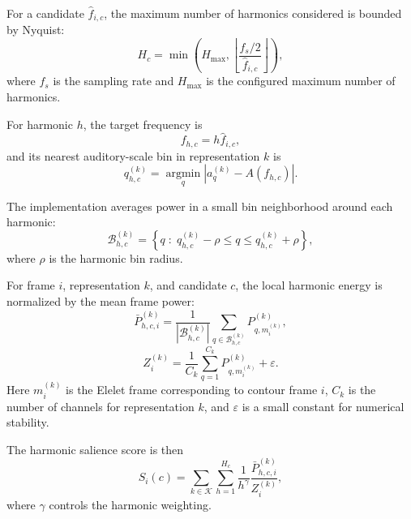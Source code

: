 For a candidate \(\hat{f}_{i,c}\), the maximum number of harmonics considered is
bounded by Nyquist:
\begin{equation}
    H_c =
    \min\left(
        H_{\max},
        \left\lfloor
            \frac{f_s/2}{\hat{f}_{i,c}}
        \right\rfloor
    \right),
\end{equation}
where \(f_s\) is the sampling rate and \(H_{\max}\) is the configured maximum
number of harmonics.

For harmonic \(h\), the target frequency is
\begin{equation}
    f_{h,c} = h \hat{f}_{i,c},
\end{equation}
and its nearest auditory-scale bin in representation \(k\) is
\begin{equation}
    q_{h,c}^{(k)}
    =
    \operatorname*{argmin}_{q}
    \left|
        a_q^{(k)}
        -
        A\!\left(f_{h,c}\right)
    \right|.
\end{equation}

The implementation averages power in a small bin neighborhood around each
harmonic:
\begin{equation}
    \mathcal{B}_{h,c}^{(k)}
    =
    \left\{
        q
        \;:\;
        q_{h,c}^{(k)} - \rho
        \le q \le
        q_{h,c}^{(k)} + \rho
    \right\},
\end{equation}
where \(\rho\) is the harmonic bin radius.

For frame \(i\), representation \(k\), and candidate \(c\), the local harmonic
energy is normalized by the mean frame power:
\begin{equation}
    \bar{P}_{h,c,i}^{(k)}
    =
    \frac{1}{\left|\mathcal{B}_{h,c}^{(k)}\right|}
    \sum_{q \in \mathcal{B}_{h,c}^{(k)}}
    P_{q,m_i^{(k)}}^{(k)},
\end{equation}
\begin{equation}
    Z_i^{(k)}
    =
    \frac{1}{C_k}
    \sum_{q=1}^{C_k}
    P_{q,m_i^{(k)}}^{(k)}
    + \varepsilon.
\end{equation}
Here \(m_i^{(k)}\) is the Elelet frame corresponding to contour frame \(i\),
\(C_k\) is the number of channels for representation \(k\), and
\(\varepsilon\) is a small constant for numerical stability.

The harmonic salience score is then
\begin{equation}
    S_i(c)
    =
    \sum_{k \in \mathcal{K}}
    \sum_{h=1}^{H_c}
    \frac{1}{h^\gamma}
    \frac{
        \bar{P}_{h,c,i}^{(k)}
    }{
        Z_i^{(k)}
    },
\end{equation}
where \(\gamma\) controls the harmonic weighting.

